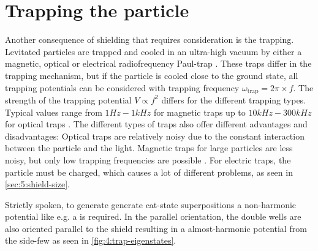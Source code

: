 \section{Trapping the particle}\label{sec:4:trapping}
Another consequence of shielding that requires consideration is the trapping. Levitated particles are trapped and cooled in an ultra-high vacuum by either a magnetic, optical or electrical radiofrequency Paul-trap \cite{GonzalezBallestero_2021}.
These traps differ in the trapping mechanism, but if the particle is cooled close to the ground state, all trapping potentials can be considered  with trapping frequency $\omega_\mathrm{trap} = 2\pi \times f$.
The strength of the trapping potential $V \propto f^2$ differs for the different trapping types. Typical values range from $1\si{Hz}-1\si{kHz}$ for magnetic traps \cite{Slezak_2018,GonzalezBallestero_2021} up to $10\si{kHz}-300\si{kHz}$ for optical traps \cite{GonzalezBallestero_2021}. 
The different types of traps also offer different advantages and disadvantages: Optical traps are relatively noisy due to the constant interaction between the particle and the light. Magnetic traps for large particles are less noisy, but only low trapping frequencies are possible \cite{GonzalezBallestero_2021}. 
For electric traps, the particle must be charged, which causes a lot of different problems, as seen in \cref{sec:5:shield-size}.

Strictly spoken, to generate generate cat-state superpositions a non-harmonic potential like e.g. a  is required. In the parallel orientation, the double wells are also oriented parallel to the shield resulting in a almost-harmonic potential from the side-few as seen in \cref{fig:4:trap-eigenstates}.

